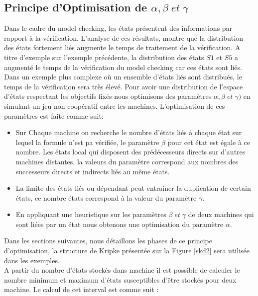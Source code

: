 
\subsection{Principe d'Optimisation de $\alpha, \beta\; et\; \gamma$}
 
Dans le cadre du model checking, les états présentent des informations par rapport à la vérification. L’analyse de ces résultats, montre que la distribution des états fortement liés augmente le temps de traitement de la vérification. A titre d'exemple sur l'exemple précédente, la distribution des états $S1$ et $S5$ a augmenté le temps de la vérification du model checking car ces états sont liés. Dans un exemple plus complexe o\`{u} un ensemble d’états liés sont distribués, le temps de la vérification sera très élevé. Pour avoir une distribution de l'espace d'états respectant les objectifs fixés nous optimisons des paramètres $\alpha, \beta \; et\; \gamma)$ en simulant un jeu non coopératif entre les machines. L'optimisation de ces paramètres est faite comme suit:
\begin{itemize}
	\item Sur Chaque machine on recherche le nombre d'états liés à chaque état sur lequel la formule n'est pa vérifiée, le paramètre $\beta$ pour cet état est égale à ce nombre. Les états local qui disposent des prédécesseurs directs sur d'autres machines distantes, la valeurs du paramètre correspond aux nombres des successeurs directs et indirects liés au même états.
	\item La limite des états liés ou dépendant peut entraîner la duplication de certain états, ce nombre états correspond à la valeur du paramètre $\gamma$. 
	\item En appliquant une heuristique sur les paramètres $\beta \; et\; \gamma$ de deux machines qui sont liées par un état nous obtenons une optimisation du paramètre $\alpha$.
\end{itemize}
Dans les sections suivantes, nous détaillons les phases de ce principe d'optimisation, la structure de Kripke présentée sur la Figure \ref{skd2} sera utilisée dans les exemples. \\

A partir du nombre d'états stockés dans machine il est possible de calculer le nombre minimum et maximum d’états susceptibles d’être stockés pour deux machine. Le calcul de cet interval est comme suit :

